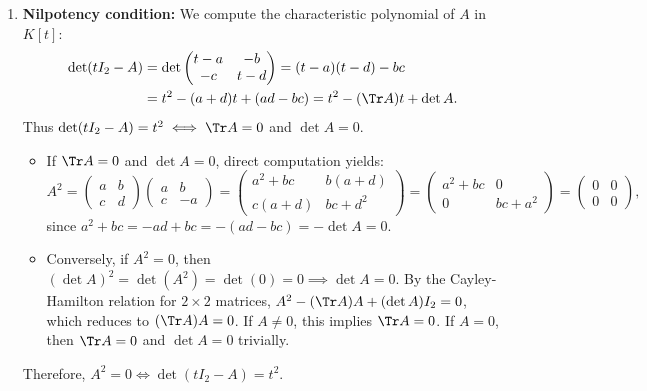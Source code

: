 \begin{exercisesolution}
\begin{enumerate}[label=\textbf{(\alph*)}]
    \item \textbf{Nilpotency condition:}
    We compute the characteristic polynomial of $A$ in $K[t]$:
    \begin{align*}
    \det(tI_2 - A) &= \det \begin{pmatrix} t - a & -b \\ -c & t - d \end{pmatrix} = (t - a)(t - d) - bc \\
    &= t^2 - (a + d)t + (ad - bc) = t^2 - (\Tr A)t + \det A.
    \end{align*}
    Thus $\det(tI_2 - A) = t^2 \iff \Tr A = 0$ and $\det A = 0$.
    \begin{itemize}
        \item If $\Tr A = 0$ and $\det A = 0$, direct computation yields:
        \[
        A^2 = \begin{pmatrix} a & b \\ c & d \end{pmatrix} \begin{pmatrix} a & b \\ c & -a \end{pmatrix} = \begin{pmatrix} a^2 + bc & b(a+d) \\ c(a+d) & bc + d^2 \end{pmatrix} = \begin{pmatrix} a^2 + bc & 0 \\ 0 & bc + a^2 \end{pmatrix} = \begin{pmatrix} 0 & 0 \\ 0 & 0 \end{pmatrix},
        \]
        since $a^2 + bc = -ad + bc = -(ad - bc) = -\det A = 0$.
        \item Conversely, if $A^2 = 0$, then $(\det A)^2 = \det(A^2) = \det(0) = 0 \implies \det A = 0$.
        By the Cayley-Hamilton relation for $2 \times 2$ matrices, $A^2 - (\Tr A)A + (\det A)I_2 = 0$, which reduces to $(\Tr A)A = 0$.
        If $A \ne 0$, this implies $\Tr A = 0$. If $A = 0$, then $\Tr A = 0$ and $\det A = 0$ trivially.
    \end{itemize}
    Therefore, $A^2 = 0 \iff \det(tI_2 - A) = t^2$. \qedhere
\end{enumerate}
\end{exercisesolution}

